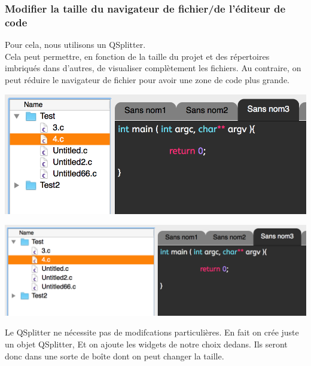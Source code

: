 \documentclass[a4paper,12pt]{article}
\begin{document}
			\subsubsection*{Modifier la taille du navigateur de fichier/de l'éditeur de code}
			Pour cela, nous utilisons un QSplitter.\\ 
			Cela peut permettre, en fonction de la taille du projet et des répertoires imbriqués dans d'autres, de visualiser complètement les fichiers. Au contraire, on peut réduire le navigateur de fichier pour avoir une zone de code plus grande.\\
			\begin{center}
				\includegraphics[scale=0.6]{images/QSplitter_1}
				\vspace{0.6cm}
			\end{center}

			\begin{center}
				\includegraphics[scale=0.6]{images/QSplitter_2}
				\vspace{0.6cm}
			\end{center}
			Le QSplitter ne nécessite pas de modifcations particulières. En fait on crée juste un objet QSplitter, Et on ajoute les widgets de notre choix dedans. Ils seront donc dans une sorte de boîte dont on peut changer la taille.\\
			
			
\end{document}
